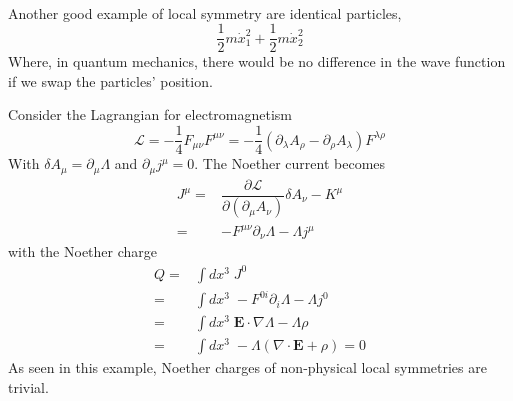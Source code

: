 \\
\begin{ex}
Another good example of local symmetry are identical particles,
\[\dfrac{1}{2}m\dot{x}_{1}^2+\dfrac{1}{2}m\dot{x}_{2}^2\]
Where, in quantum mechanics, there would be no difference in the wave function if we swap the particles' position. 
\end{ex}
\vspace{2ex}
\begin{ex}
Consider the Lagrangian for electromagnetism
\[\mathcal{L}=-\dfrac{1}{4}F_{\mu \nu }F^{\mu \nu }=-\dfrac{1}{4}(\partial _{\lambda }A_{\rho }-\partial _{\rho }A_{\lambda })F^{\lambda \rho }\]
With $\delta A_{\mu }=\partial _{\mu }\Lambda $ and $\partial _{\mu }j^{\mu }=0$. The Noether current becomes
\begin{align*}
	J^{\mu }=&\dfrac{\partial \mathcal{L}}{\partial (\partial _{\mu }A_{\nu })}\delta A_{\nu }-K^{\mu } \\
=&-F^{\mu \nu }\partial _{\nu }\Lambda -\Lambda j^{\mu }
\end{align*}
with the Noether charge
\begin{align*}
	Q=&\int dx^3\;J^{0}\\
	=&\int dx^3\;-F^{0i}\partial _{i}\Lambda -\Lambda j^{0}\\
	=&\int dx^3\;{\bm E}\cdot \nabla \Lambda -\Lambda \rho \\
	=&\int dx^3\;-\Lambda (\nabla \cdot {\bm E}+\rho )=0
\end{align*}
As seen in this example, Noether charges of non-physical local symmetries are trivial.
\end{ex}
\vspace{2ex}

